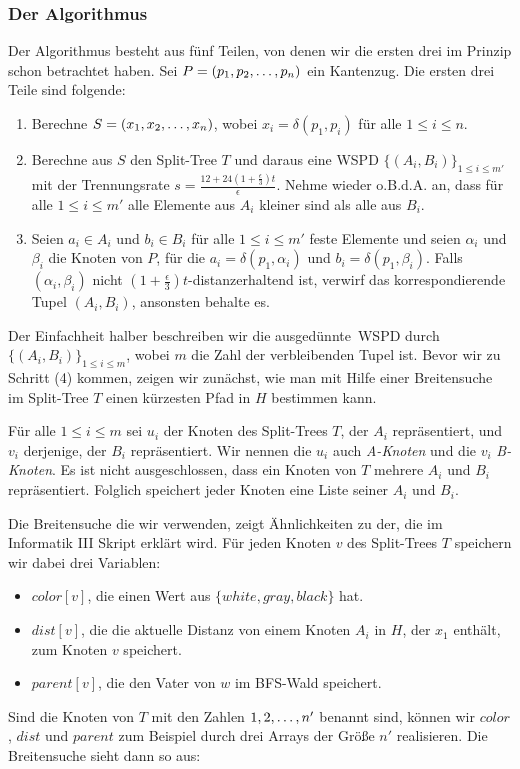     \subsubsection*{Der Algorithmus}
    Der Algorithmus besteht aus fünf Teilen, von denen wir die ersten drei im Prinzip schon betrachtet haben.
    Sei $P = (p_1, p_2, \mathellipsis, p_n)$ ein Kantenzug. 
    Die ersten drei Teile sind folgende:
    \begin{enumerate}
    	\item Berechne $S = (x_1, x_2, \mathellipsis, x_n)$, wobei $x_i = \delta(p_1, p_i)$ für alle $1 \leq i \leq n$.
    	\item Berechne aus $S$ den Split-Tree $T$ und daraus eine WSPD $\{(A_i, B_i)\}_{1 \leq i \leq m'}$ mit der Trennungsrate $s = \frac{12 + 24(1 + \frac{\epsilon}{3})t}{\epsilon}$. Nehme wieder o.B.d.A. an, dass für alle $1 \leq i \leq m'$ alle Elemente aus $A_i$ kleiner sind als alle aus $B_i$.
    	\item Seien $a_i \in A_i$ und $b_i \in B_i$ für alle $1 \leq i \leq m'$ feste Elemente und seien $\alpha_i$ und  $\beta_i$ die Knoten von $P$, für die $a_i = \delta(p_1, \alpha_i)$ und $b_i = \delta(p_1, \beta_i)$. Falls $(\alpha_i, \beta_i)$ nicht $(1+\frac{\epsilon}{3})t$-distanzerhaltend ist, verwirf das korrespondierende Tupel $(A_i, B_i)$, ansonsten behalte es.
    \end{enumerate}
    
    Der Einfachheit halber beschreiben wir die \glqq ausgedünnte\grqq\ WSPD durch $\{(A_i, B_i)\}_{1\leq i \leq m}$, wobei $m$ die Zahl der verbleibenden Tupel ist.
    Bevor wir zu Schritt (4) kommen, zeigen wir zunächst, wie man mit Hilfe einer Breitensuche im Split-Tree $T$ einen kürzesten Pfad in $H$ bestimmen kann.  
    
    Für alle $1 \leq i \leq m$ sei $u_i$ der Knoten des Split-Trees $T$, der $A_i$ repräsentiert, und $v_i$ derjenige, der $B_i$ repräsentiert. Wir nennen die $u_i$ auch \emph{A-Knoten} und die $v_i$ \emph{B-Knoten}. Es ist nicht ausgeschlossen, dass ein Knoten von $T$ mehrere $A_i$ und $B_i$ repräsentiert. Folglich speichert jeder Knoten eine Liste seiner $A_i$ und $B_i$.
    
    Die Breitensuche die wir verwenden, zeigt Ähnlichkeiten zu der, die im Informatik III Skript \cite{hagerup} erklärt wird. Für jeden Knoten $v$ des Split-Trees $T$ speichern wir dabei drei Variablen:
    \begin{itemize}
    	\item $color[v]$, die einen Wert aus $\{white, gray, black\}$ hat.
    	\item $dist[v]$, die die aktuelle Distanz von einem Knoten $A_i$ in $H$, der $x_1$ enthält, zum Knoten $v$ speichert.
    	\item $parent[v]$, die den Vater von $w$ im BFS-Wald speichert.
    \end{itemize}
    Sind die Knoten von $T$ mit den Zahlen $1, 2,\mathellipsis, n'$ benannt sind, können wir $color$, $dist$ und $parent$ zum Beispiel durch drei Arrays der Größe $n'$ realisieren.
    Die Breitensuche sieht dann so aus:
    
